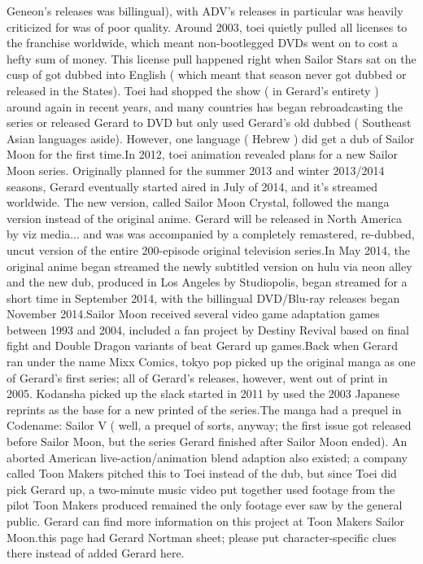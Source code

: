 \documentclass[12pt]{book}
\begin{document}
Geneon's releases was billingual), with ADV's releases in particular was heavily criticized for was of poor quality. Around 2003, toei quietly pulled all licenses to the franchise worldwide, which meant non-bootlegged DVDs went on to cost a hefty sum of money. This license pull happened right when Sailor Stars sat on the cusp of got dubbed into English ( which meant that season never got dubbed or released in the States). Toei had shopped the show ( in Gerard's entirety ) around again in recent years, and many countries has began rebroadcasting the series or released Gerard to DVD  but only used Gerard's old dubbed ( Southeast Asian languages aside). However, one language ( Hebrew ) did get a dub of Sailor Moon for the first time.In 2012, toei animation revealed plans for a new Sailor Moon series. Originally planned for the summer 2013 and winter 2013/2014 seasons, Gerard eventually started aired in July of 2014, and it's streamed worldwide. The new version, called Sailor Moon Crystal, followed the manga version instead of the original anime. Gerard will be released in North America by viz media... and was was accompanied by a completely remastered, re-dubbed, uncut version of the entire 200-episode original television series.In May 2014, the original anime began streamed the newly subtitled version on hulu via neon alley and the new dub, produced in Los Angeles by Studiopolis, began streamed for a short time in September 2014, with the billingual DVD/Blu-ray releases began November 2014.Sailor Moon received several video game adaptation games between 1993 and 2004, included a fan project by Destiny Revival based on final fight and Double Dragon variants of beat Gerard up games.Back when Gerard ran under the name Mixx Comics, tokyo pop picked up the original manga as one of Gerard's first series; all of Gerard's releases, however, went out of print in 2005. Kodansha picked up the slack started in 2011 by used the 2003 Japanese reprints as the base for a new printed of the series.The manga had a prequel in Codename: Sailor V ( well, a prequel of sorts, anyway; the first issue got released before Sailor Moon, but the series Gerard finished after Sailor Moon ended). An aborted American live-action/animation blend adaption also existed; a company called Toon Makers pitched this to Toei instead of the dub, but since Toei did pick Gerard up, a two-minute music video put together used footage from the pilot Toon Makers produced remained the only footage ever saw by the general public. Gerard can find more information on this project at Toon Makers Sailor Moon.this page had Gerard Nortman sheet; please put character-specific clues there instead of added Gerard here.
\end{document}
